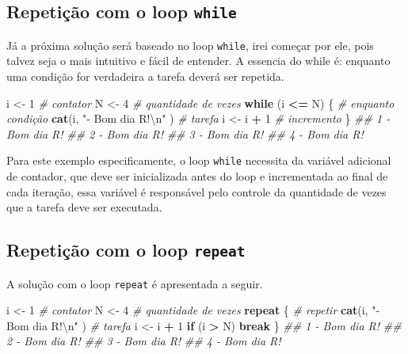 \documentclass[
  11pt,
  a5paper,
  openany]{book}
\newenvironment{Shaded}{\begin{snugshade}}{\end{snugshade}}
\newcommand{\CharTok}[1]{\textcolor[rgb]{0.31,0.60,0.02}{#1}}
\newcommand{\CommentTok}[1]{\textcolor[rgb]{0.56,0.35,0.01}{\textit{#1}}}
\newcommand{\ControlFlowTok}[1]{\textcolor[rgb]{0.13,0.29,0.53}{\textbf{#1}}}
\newcommand{\DecValTok}[1]{\textcolor[rgb]{0.00,0.00,0.81}{#1}}
\newcommand{\KeywordTok}[1]{\textcolor[rgb]{0.13,0.29,0.53}{\textbf{#1}}}
\newcommand{\NormalTok}[1]{#1}
\newcommand{\OperatorTok}[1]{\textcolor[rgb]{0.81,0.36,0.00}{\textbf{#1}}}
\newcommand{\StringTok}[1]{\textcolor[rgb]{0.31,0.60,0.02}{#1}}
\begin{document}
\hypertarget{repetiuxe7uxe3o-com-o-loop-while}{%
\subsection{\texorpdfstring{Repetição com o loop \texttt{while}}{Repetição com o loop while}}\label{repetiuxe7uxe3o-com-o-loop-while}}

Já a próxima solução será baseado no loop \texttt{while}, irei começar por ele, pois talvez seja o mais intuitivo e fácil de entender. A essencia do while é: enquanto uma condição for verdadeira a tarefa deverá ser repetida.

\begin{Shaded}
\begin{Highlighting}[]
\NormalTok{i <-}\StringTok{ }\DecValTok{1} \CommentTok{# contator}
\NormalTok{N <-}\StringTok{ }\DecValTok{4} \CommentTok{# quantidade de vezes}
\ControlFlowTok{while}\NormalTok{ (i }\OperatorTok{<=}\StringTok{ }\NormalTok{N) \{ }\CommentTok{# enquanto condição}
    \KeywordTok{cat}\NormalTok{(i, }\StringTok{"- Bom dia R!}\CharTok{\textbackslash{}n}\StringTok{"}\NormalTok{ ) }\CommentTok{# tarefa}
\NormalTok{    i <-}\StringTok{ }\NormalTok{i }\OperatorTok{+}\StringTok{ }\DecValTok{1} \CommentTok{# incremento}
\NormalTok{\}}
\CommentTok{## 1 - Bom dia R!}
\CommentTok{## 2 - Bom dia R!}
\CommentTok{## 3 - Bom dia R!}
\CommentTok{## 4 - Bom dia R!}
\end{Highlighting}
\end{Shaded}

Para este exemplo especificamente, o loop \texttt{while} necessita da variável adicional de contador, que deve ser inicializada antes do loop e incrementada ao final de cada iteração, essa variável é responsável pelo controle da quantidade de vezes que a tarefa deve ser executada.

\hypertarget{repetiuxe7uxe3o-com-o-loop-repeat}{%
\subsection{\texorpdfstring{Repetição com o loop \texttt{repeat}}{Repetição com o loop repeat}}\label{repetiuxe7uxe3o-com-o-loop-repeat}}

A solução com o loop \texttt{repeat} é apresentada a seguir.

\begin{Shaded}
\begin{Highlighting}[]
\NormalTok{i <-}\StringTok{ }\DecValTok{1} \CommentTok{# contator}
\NormalTok{N <-}\StringTok{ }\DecValTok{4} \CommentTok{# quantidade de vezes}
\ControlFlowTok{repeat}\NormalTok{ \{ }\CommentTok{# repetir}
    \KeywordTok{cat}\NormalTok{(i, }\StringTok{"- Bom dia R!}\CharTok{\textbackslash{}n}\StringTok{"}\NormalTok{ ) }\CommentTok{# tarefa}
\NormalTok{    i <-}\StringTok{ }\NormalTok{i }\OperatorTok{+}\StringTok{ }\DecValTok{1}
    \ControlFlowTok{if}\NormalTok{ (i }\OperatorTok{>}\StringTok{ }\NormalTok{N) }\ControlFlowTok{break}
\NormalTok{\}}
\CommentTok{## 1 - Bom dia R!}
\CommentTok{## 2 - Bom dia R!}
\CommentTok{## 3 - Bom dia R!}
\CommentTok{## 4 - Bom dia R!}
\end{Highlighting}
\end{Shaded}
\end{document}
